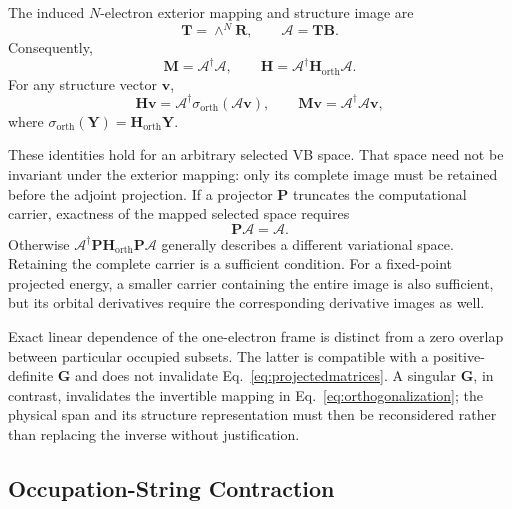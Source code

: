 \documentclass[12pt]{article}
\newcommand{\orth}{\mathrm{orth}}
\begin{document}
The induced \(N\)-electron exterior mapping and structure image are
\begin{equation}
 \mathbf T=\wedge^N\mathbf R,
 \qquad \boldsymbol{\mathcal A}=\mathbf T\mathbf B.
 \label{eq:exteriormap}
\end{equation}
Consequently,
\begin{equation}
 \boxed{\mathbf M=\boldsymbol{\mathcal A}^\dagger\boldsymbol{\mathcal A},
 \qquad
 \mathbf H=\boldsymbol{\mathcal A}^\dagger
                 \mathbf H_{\orth}\boldsymbol{\mathcal A}.}
 \label{eq:projectedmatrices}
\end{equation}
For any structure vector \(\mathbf v\),
\begin{equation}
 \mathbf H\mathbf v=
 \boldsymbol{\mathcal A}^\dagger
 \sigma_{\orth}(\boldsymbol{\mathcal A}\mathbf v),
 \qquad
 \mathbf M\mathbf v=
 \boldsymbol{\mathcal A}^\dagger
 \boldsymbol{\mathcal A}\mathbf v,
 \label{eq:projectedaction}
\end{equation}
where \(\sigma_{\orth}(\mathbf Y)=\mathbf H_{\orth}\mathbf Y\).

These identities hold for an arbitrary selected VB space. That space need not be invariant under the exterior mapping: only its complete image must be retained before the adjoint projection. If a projector \(\mathbf P\) truncates the computational carrier, exactness of the mapped selected space requires
\begin{equation}
 \mathbf P\boldsymbol{\mathcal A}=\boldsymbol{\mathcal A}.
 \label{eq:carriercondition}
\end{equation}
Otherwise \(\boldsymbol{\mathcal A}^\dagger\mathbf P
\mathbf H_{\orth}\mathbf P\boldsymbol{\mathcal A}\) generally describes a different variational space. Retaining the complete carrier is a sufficient condition. For a fixed-point projected energy, a smaller carrier containing the entire image is also sufficient, but its orbital derivatives require the corresponding derivative images as well.

Exact linear dependence of the one-electron frame is distinct from a zero overlap between particular occupied subsets. The latter is compatible with a positive-definite \(\mathbf G\) and does not invalidate Eq.~\eqref{eq:projectedmatrices}. A singular \(\mathbf G\), in contrast, invalidates the invertible mapping in Eq.~\eqref{eq:orthogonalization}; the physical span and its structure representation must then be reconsidered rather than replacing the inverse without justification.

\subsection{Occupation-String Contraction}
\end{document}
